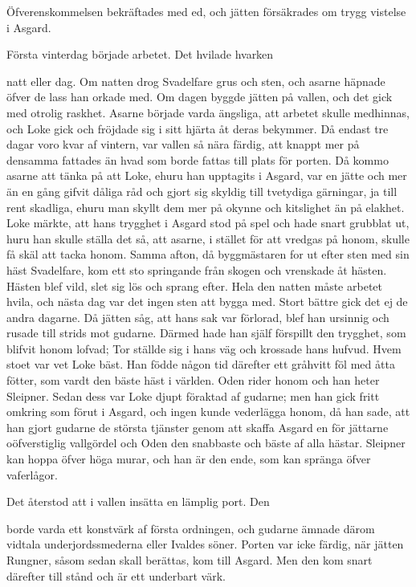 Öfverenskommelsen bekräftades med ed, och jätten försäkrades om trygg
vistelse i Asgard.

Första vinterdag började arbetet. Det hvilade hvarken

natt eller dag. Om natten drog Svadelfare grus och sten, och asarne
häpnade öfver de lass han orkade med. Om dagen byggde jätten på vallen,
och det gick med otrolig raskhet. Asarne började varda ängsliga, att
arbetet skulle medhinnas, och Loke gick och fröjdade sig i sitt hjärta
åt deras bekymmer. Då endast tre dagar voro kvar af vintern, var vallen
så nära färdig, att knappt mer på densamma fattades än hvad som borde
fattas till plats för porten. Då kommo asarne att tänka på att Loke,
ehuru han upptagits i Asgard, var en jätte och mer än en gång gifvit
dåliga råd och gjort sig skyldig till tvetydiga gärningar, ja till rent
skadliga, ehuru man skyllt dem mer på okynne och kitslighet än på
elakhet. Loke märkte, att hans trygghet i Asgard stod på spel och hade
snart grubblat ut, huru han skulle ställa det så, att asarne, i stället
för att vredgas på honom, skulle få skäl att tacka honom. Samma afton,
då byggmästaren for ut efter sten med sin häst Svadelfare, kom ett sto
springande från skogen och vrenskade åt hästen. Hästen blef vild, slet
sig lös och sprang efter. Hela den natten måste arbetet hvila, och nästa
dag var det ingen sten att bygga med. Stort bättre gick det ej de andra
dagarne. Då jätten såg, att hans sak var förlorad, blef han ursinnig och
rusade till strids mot gudarne. Därmed hade han själf förspillt den
trygghet, som blifvit honom lofvad; Tor ställde sig i hans väg och
krossade hans hufvud. Hvem stoet var vet Loke bäst. Han födde någon tid
därefter ett gråhvitt föl med åtta fötter, som vardt den bäste häst i
världen. Oden rider honom och han heter Sleipner. Sedan dess var Loke
djupt föraktad af gudarne; men han gick fritt omkring som förut i
Asgard, och ingen kunde vederlägga honom, då han sade, att han gjort
gudarne de största tjänster genom att skaffa Asgard en för jättarne
oöfverstiglig vallgördel och Oden den snabbaste och bäste af alla
hästar. Sleipner kan hoppa öfver höga murar, och han är den ende, som
kan spränga öfver vaferlågor.

Det återstod att i vallen insätta en lämplig port. Den

borde varda ett konstvärk af första ordningen, och gudarne ämnade därom
vidtala underjordssmederna eller Ivaldes söner. Porten var icke färdig,
när jätten Rungner, såsom sedan skall berättas, kom till Asgard. Men den
kom snart därefter till stånd och är ett underbart värk.


